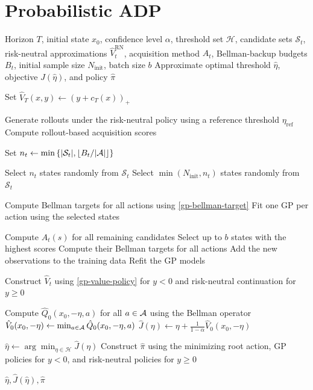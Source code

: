 \section{Probabilistic ADP}
\label{app:prob-adp}

\begin{algorithm}[H]
	\caption{Probabilistic ADP}
	\label{alg:prob-adp}
	\begin{algorithmic}[1]
		\Require Horizon $T$, initial state $x_0$, confidence level $\alpha$, threshold set $\mathcal{H}$, candidate sets $\mathcal{S}_t$, risk-neutral approximations $\hat{V}_t^{\text{RN}}$,
		acquisition method $A_t$, Bellman-backup budgets $B_t$, initial sample size $N_{\text{init}}$, batch size $b$
		\Ensure Approximate optimal threshold $\hat\eta$,
		objective $\hat{J}(\hat{\eta})$, and policy $\hat{\pi}$
		
		\State Set $\hat{V}_T(x,y) \gets (y + c_T(x))_+$
		
		\State Generate rollouts under the risk-neutral policy using a reference threshold $\eta_{\text{ref}}$
		\State Compute rollout-based acquisition scores
		\EndIf
		
		\State Set $n_t \gets \min\left\{ |\mathcal{S}_t|, \lfloor B_t/|\mathcal{A}|\rfloor \right\}$
		
		\State Select $n_t$ states randomly from $\mathcal{S}_t$
		\Else
		\State Select $\min(N_{\text{init}}, n_t)$ states randomly from $\mathcal{S}_t$
		\EndIf
		
		\State Compute Bellman targets for all actions using \eqref{gp-bellman-target}
		\State Fit one GP per action using the selected states
		
		\State Compute $A_t(s)$ for all remaining candidates
		\State Select up to $b$ states with the highest scores
		\State Compute their Bellman targets for all actions
		\State Add the new observations to the training data
		\State Refit the GP models
		\EndWhile
		
		\State Construct $\hat{V}_t$ using
		\eqref{gp-value-policy} for $y<0$
		and risk-neutral continuation for $y\geq0$
		\EndFor
		
		\State Compute $\hat{Q}_0(x_0, -\eta, a)$
		for all $a \in \mathcal{A}$ using the Bellman operator
		\State $\hat V_0(x_0, -\eta)
		\gets \min_{a \in \mathcal{A}} \hat{Q}_0(x_0, -\eta, a)$
		\State $\hat{J}(\eta)
		\gets \eta + \frac{1}{1 - \alpha} \hat{V}_0(x_0, -\eta)$
		\EndFor
		
		\State $\hat\eta
		\gets \arg\min_{\eta \in \mathcal{H}} \hat{J}(\eta)$
		\State Construct $\hat{\pi}$ using the minimizing root action, GP policies for $y<0$, and risk-neutral policies for $y\geq0$
		
		\State \Return $\hat{\eta},\hat{J}(\hat{\eta}),\hat{\pi}$
	\end{algorithmic}
\end{algorithm}
